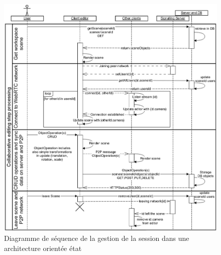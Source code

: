 \begin{figure}[ht!]
	\centering
	\includegraphics[trim={0 0 0 3cm},clip,width=1\columnwidth]
	{eps/sequence_wscg.eps}
	\caption{Diagramme de séquence de la gestion de la session dans une 
	architecture \og orientée état\fg{}}
	\label{fig:sequence_state}
\end{figure}

%
%
%
%
%
